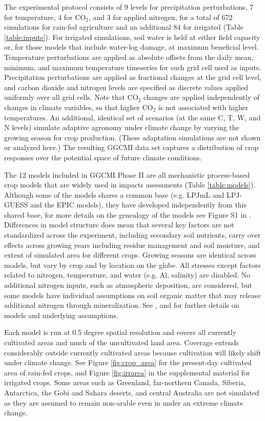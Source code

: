 \documentclass[preprint, 5p, times, twocolumn]{elsarticle}
\begin{document}
The experimental protocol consists of 9 levels for precipitation perturbations, 7 for temperature, 4 for CO$_2$, and 3 for applied nitrogen, for a total of 672 simulations for rain-fed agriculture and an additional 84 for irrigated (Table \ref{table:inputs}). For irrigated simulations, soil water is held at either field capacity or, for those models that include water-log damage, at maximum beneficial level.  Temperature perturbations are applied as absolute offsets from the daily mean, minimum, and maximum temperature timeseries for each grid cell used as inputs. Precipitation perturbations are applied as fractional changes at the grid cell level, and carbon dioxide and nitrogen levels are specified as discrete values applied uniformly over all grid cells. Note that CO$_2$ changes are applied independently of changes in climate variables, so that higher CO$_2$ is not associated with higher temperatures. An additional, identical set of scenarios (at the same C, T, W, and N levels) simulate adaptive agronomy under climate change by varying the growing season for crop production. (These adaptation simulations are not shown or analyzed here.) The resulting GGCMI data set captures a distribution of crop responses over the potential space of future climate conditions.

The 12 models included in GGCMI Phase II are all mechanistic process-based crop models that are widely used in impacts assessments (Table \ref{table:models}). Although some of the models shares a common base (e.g. LPJmL and LPJ-GUESS and the EPIC models), they have developed independently from this shared base, for more details on the genealogy of the models see Figure S1 in \citet{Rosenzweig2014}. Differences in model structure does mean that several key factors are not standardized across the experiment, including secondary soil nutrients, carry over effects across growing years including residue management and soil moisture, and extent of simulated area for different crops. Growing seasons are identical across models, but vary by crop and by location on the globe. All stresses except factors related to nitrogen, temperature, and water (e.g. Al, salinity) are disabled. No additional nitrogen inputs, such as atmospheric deposition, are considered, but some models have individual assumptions on soil organic matter that may release additional nitrogen through mineralization. See \citet{Rosenzweig2014},  \citet{Elliott2015} and \citet{muller_global_2017} for further details on models and underlying assumptions.

Each model is run at 0.5 degree spatial resolution and covers all currently cultivated areas and much of the uncultivated land area.  Coverage extends considerably outside currently cultivated areas because cultivation will likely shift under climate change. See Figure \ref{fig:crop_area} for the present-day cultivated area of rain-fed crops, and Figure \ref{fig:irrarea} in the supplemental material for irrigated crops. Some areas such as Greenland, far-northern Canada, Siberia, Antarctica, the Gobi and Sahara deserts, and central Australia are not simulated as they are assumed to remain non-arable even in under an extreme climate change.  
\end{document}

